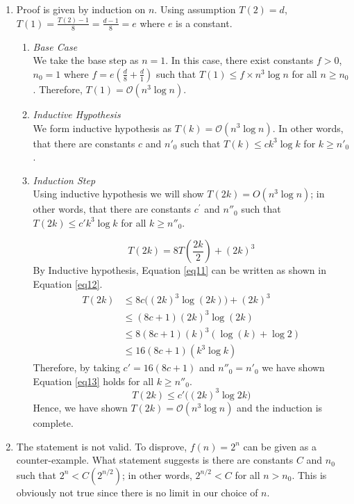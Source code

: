 \begin{enumerate}[label=(\alph*)]
\item Proof is given by induction on $n$.
Using assumption $T(2) = d$, $T(1) = \frac{T(2)-1}{8} = \frac{d-1}{8} = e$ where $e$ is a constant.
\begin{enumerate}[label=\arabic*.]
\item \textit{Base Case}\\
We take the base step as $n = 1$.
In this case, there exist constants $f > 0$, $n_0 = 1$ where $f = e(\frac{d}{8}+\frac{d}{1})$ such that $T(1) \leq f \times n^3 \log n$ for all $n \geq n_0$.
Therefore, $T(1) = \mathcal{O}(n^3 \log n)$.
\item \textit{Inductive Hypothesis}\\
We form inductive hypothesis as $T(k)=\mathcal{O}(n^3 \log n)$.
In other words, that there are constants $c$ and $n'_0$ such that $T(k) \leq ck^3 \log k$ for $k \geq n'_0$.
\item \textit{Induction Step}\\
Using inductive hypothesis we will show $T(2k) = O(n^3\log n)$; in other words, that there are constants $c^\prime$ and $n''_0$ such that $T(2k) \leq c' k^3 \log k$ for all $k \geq n''_0$.

\begin{equation}\label{eq11}
T(2k) = 8 T(\frac{2k}{2}) + (2k)^3
\end{equation}
By Inductive hypothesis, Equation \ref{eq11} can be written as shown in Equation \ref{eq12}.
\begin{equation}\label{eq12}
\begin{aligned}
T(2k) &\leq 8c \big( (2k)^3 \log (2k) \big) + (2k)^3\\
&\leq (8c + 1) (2k)^3 \log (2k)\\
&\leq 8(8c+1) (k)^3 (\log (k) + \log 2)\\
&\leq 16(8c+1) (k^3 \log k)
\end{aligned}
\end{equation}
Therefore, by taking $c' = 16(8c+1)$ and $n''_0 = n'_0$ we have shown Equation \ref{eq13} holds for all $k \geq n''_0$.
\begin{equation}\label{eq13}
T(2k) \leq c' \big( (2k)^3 \log 2k \big)
\end{equation}
Hence, we have shown $T(2k) = \mathcal{O}(n^3\log n)$ and the induction is complete.
\end{enumerate}
\item The statement is not valid.
To disprove, $f(n)=2^n$ can be given as a counter-example.
What statement suggests is there are constants $C$ and $n_0$ such that $2^n < C(2^{n/2})$; in other words, $2^{n/2} < C$ for all $n > n_0$.
This is obviously not true since there is no limit in our choice of $n$.
\end{enumerate}
